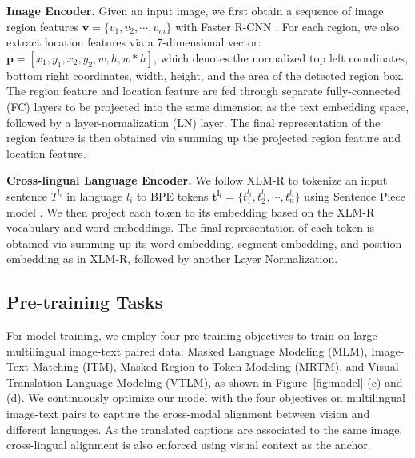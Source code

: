 \documentclass[final]{cvpr}
\newcommand{\luowei}[1]{\textcolor{cyan}{\small{\bf [Luowei: #1 ]}}}
\newcommand{\jj}[1]{\textcolor{red}{\small{\bf [JJ: #1 ]}}}
\newcommand{\mingyang}[1]{\textcolor{brown}{\small{\bf [Mingyang: #1 ]}}}
\newcommand{\head}[1]{\noindent\textbf{#1}}
\begin{document}
 

\vspace{5pt}
\head{Image Encoder.}
Given an input image, we first obtain a sequence of image region features $\boldsymbol{v} = \{v_1, v_2, \cdots, v_m\}$ with Faster R-CNN \cite{faster-rcnn}. For each region, we also extract location features via a 7-dimensional vector: $\boldsymbol{p} = [x_1, y_1, x_2, y_2, w, h, w*h ]$, which denotes the normalized top left coordinates, bottom right coordinates, width, height, and the area of the detected region box. The region feature and location feature are fed through separate fully-connected (FC) layers to be projected into the same dimension as the text embedding space, followed by a layer-normalization (LN) layer. The final representation of the region feature is then obtained via summing up the projected region feature and location feature.

\vspace{5pt}
\head{Cross-lingual Language Encoder.}
We follow XLM-R \cite{XLMR} to tokenize an input sentence $T^{l_i}$ in language $l_i$ to BPE tokens $\boldsymbol{t^{l_i}} = \{t_1^{l_i}, t_2^{l_i}, \cdots, t_n^{l_i}\}$ using Sentence Piece model \cite{SentencePiece}. We then project each token to its embedding based on the XLM-R vocabulary and word embeddings. %
The final representation of each token is obtained via summing up its word embedding, segment embedding, and position embedding as in XLM-R, followed by another Layer Normalization. 


\subsection{Pre-training Tasks}
For model training, we employ four pre-training objectives to train on large multilingual image-text paired data: Masked Language Modeling (MLM), Image-Text Matching (ITM), Masked Region-to-Token Modeling (MRTM), and Visual Translation Language Modeling (VTLM), as shown in Figure~\ref{fig:model} (c) and (d). We continuously optimize our model with the four objectives on multilingual image-text pairs to capture the cross-modal alignment between vision and different languages. As the translated captions are associated to the same image, cross-lingual alignment is also enforced using visual context as the anchor. 
\end{document}
